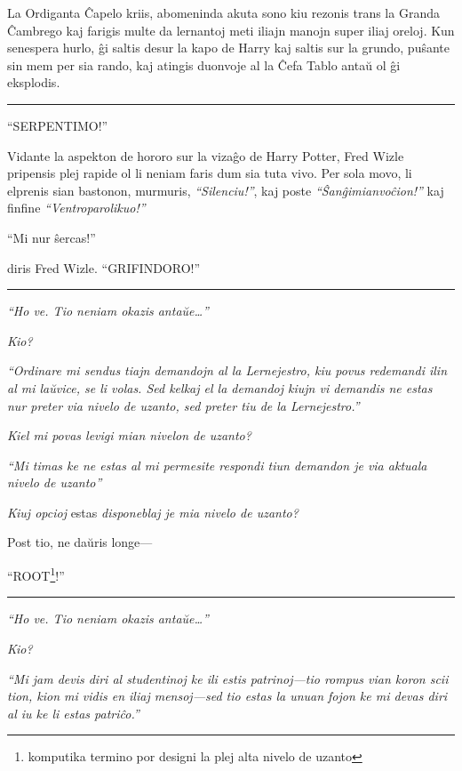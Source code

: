 La Ordiganta Ĉapelo kriis, abomeninda akuta sono kiu rezonis trans la
Granda Ĉambrego kaj farigis multe da lernantoj meti iliajn manojn
super iliaj oreloj. Kun senespera hurlo, ĝi saltis desur la kapo de
Harry kaj saltis sur la grundo, puŝante sin mem per sia rando, kaj
atingis duonvoje al la Ĉefa Tablo antaŭ ol ĝi eksplodis.

\begin{center}\rule{3in}{0.4pt}\end{center}

``SERPENTIMO!''

Vidante la aspekton de hororo sur la vizaĝo de Harry Potter, Fred
Wizle pripensis plej rapide ol li neniam faris dum sia tuta vivo. Per
sola movo, li elprenis sian bastonon, murmuris, \emph{``Silenciu!''},
kaj poste \emph{``Ŝanĝimianvoĉion!''} kaj finfine
\emph{``Ventroparolikuo!''}

``Mi nur ŝercas!''

diris Fred Wizle. ``GRIFINDORO!''

\begin{center}\rule{3in}{0.4pt}\end{center}

\emph{``Ho ve. Tio neniam okazis antaŭe\ldots''}

\emph{Kio?}

\emph{``Ordinare mi sendus tiajn demandojn al la Lernejestro, kiu
  povus redemandi ilin al mi laŭvice, se li volas. Sed kelkaj el la
  demandoj kiujn vi demandis ne estas nur preter via nivelo de uzanto,
  sed preter tiu de la Lernejestro.''}

\emph{Kiel mi povas levigi mian nivelon de uzanto?}

\emph{``Mi timas ke ne estas al mi permesite respondi tiun demandon je
  via aktuala nivelo de uzanto''}

\emph{Kiuj opcioj} estas \emph{disponeblaj je mia nivelo de uzanto?}

Post tio, ne daŭris longe—

``ROOT\footnote{komputika termino por designi la plej alta nivelo de
  uzanto}!''

\begin{center}\rule{3in}{0.4pt}\end{center}

\emph{``Ho ve. Tio neniam okazis antaŭe\ldots''}

\emph{Kio?}

\emph{``Mi jam devis diri al studentinoj ke ili estis patrinoj—tio
  rompus vian koron scii tion, kion mi vidis en iliaj mensoj—sed tio
  estas la unuan fojon ke mi devas diri al iu ke li estas patriĉo.''}

